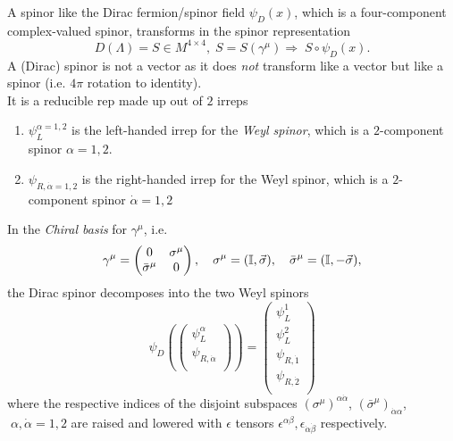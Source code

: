 \begin{enumerate}
 A spinor like the Dirac fermion/spinor field $\psi_D(x)$, which is a four-component complex-valued spinor, transforms in the spinor representation
 \begin{equation}
 	D(\Lambda) = S \in M^{4 \times 4}, \; S=S(\gamma^\mu) \Rightarrow \; S\circ \psi_D(x).
 \end{equation}
 A (Dirac) spinor is not a vector as it does \emph{not} transform like a vector but like a spinor (i.e. $4\pi$ rotation to identity).\\
 It is a reducible rep made up out of $2$ irreps
 \begin{enumerate}
 	\item $\psi^{\alpha=1,2}_L$ is the left-handed irrep for the \emph{Weyl spinor}, which is a $2$-component spinor $\alpha=1,2$.
 	\item $\psi_{R,\dot{\alpha}=1,2}$ is the right-handed irrep for the Weyl spinor, which is a $2$-component spinor $\dot{\alpha}=1,2$
 \end{enumerate}
In the \emph{Chiral basis} for $\gamma^\mu$, i.e. 
\begin{equation*}
	\gamma^\mu = \begin{pmatrix}
	0&\sigma^\mu \\ 
	\bar{ \sigma}^\mu &0\\
	\end{pmatrix}, \quad \sigma^\mu =(\mathbb{I},\vec{\sigma}), \quad \bar{ \sigma }^\mu =(\mathbb{I},-\vec{\sigma}),
\end{equation*}
the Dirac spinor decomposes into the two Weyl spinors
\begin{equation}
\psi_D(\begin{pmatrix}
\psi^\alpha_L\\ \psi_{R,\dot{\alpha}} \\
\end{pmatrix})
= \begin{pmatrix}
\psi^1_L\\
\psi^2_L\\
\psi_{R,\dot{1}} \\
\psi_{R,\dot{2}} \\
\end{pmatrix}
\end{equation}
where the respective indices of the disjoint subspaces $(\sigma^\mu)^{\alpha \dot{\alpha}}$, $(\bar{ \sigma }^\mu)_{\dot{\alpha}\alpha}$, $\;\alpha,\dot{\alpha}=1,2$ are raised and lowered with $\epsilon$ tensors $\epsilon^{\alpha \beta}, \epsilon_{\dot{\alpha}\dot{\beta}}$ respectively.\\

\end{enumerate}
